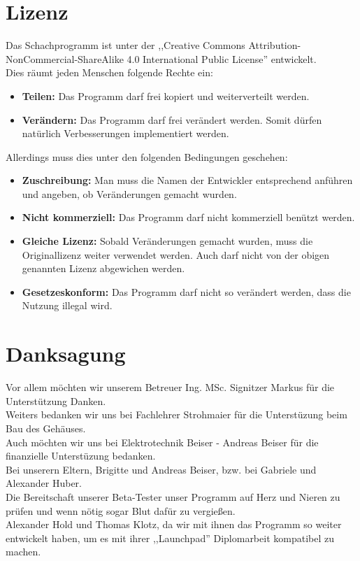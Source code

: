 \documentclass[12pt,a4paper]{article}
\begin{document}
{%
\clearpage\vfill\newpage{}

\section{Lizenz}
\label{SEC:licence}

Das Schachprogramm ist unter der ,,Creative Commons Attribution-NonCommercial-ShareAlike 4.0 International Public License'' entwickelt. \\
Dies räumt jeden Menschen folgende Rechte ein: 
\begin{itemize}
	\item{\textbf{Teilen:} Das Programm darf frei kopiert und weiterverteilt werden.}
	\item{\textbf{Verändern:} Das Programm darf frei verändert werden. Somit dürfen natürlich Verbesserungen implementiert werden.}
\end{itemize}

Allerdings muss dies unter den folgenden Bedingungen geschehen:
\begin{itemize}
	\item{\textbf{Zuschreibung:} Man muss die Namen der Entwickler entsprechend anführen und angeben, ob Veränderungen gemacht wurden.}
	\item{\textbf{Nicht kommerziell:} Das Programm darf nicht kommerziell benützt werden.}
	\item{\textbf{Gleiche Lizenz:} Sobald Veränderungen gemacht wurden, muss die Originallizenz weiter verwendet werden. Auch darf nicht von der obigen genannten Lizenz abgewichen werden.}
	\item{\textbf{Gesetzeskonform:} Das Programm darf nicht so verändert werden, dass die Nutzung illegal wird.}
\end{itemize}

\newpage
\section{Danksagung}
\label{SEC:THANKS}

Vor allem möchten wir unserem Betreuer Ing. MSc. Signitzer Markus für die Unterstützung Danken. \\
Weiters bedanken wir uns bei Fachlehrer Strohmaier für die Unterstüzung beim Bau des Gehäuses. \\[1ex]
Auch möchten wir uns bei Elektrotechnik Beiser - Andreas Beiser für die finanzielle Unterstüzung bedanken. \\[1ex]
Bei unserern Eltern, Brigitte und Andreas Beiser, bzw. bei Gabriele und Alexander Huber. \\
Die Bereitschaft unserer Beta-Tester unser Programm auf Herz und Nieren zu prüfen und wenn nötig sogar Blut dafür zu vergießen.\\
Alexander Hold und Thomas Klotz, da wir mit ihnen das Programm so weiter entwickelt haben, um es mit ihrer ,,Launchpad'' Diplomarbeit kompatibel zu machen. \\

}
\end{document}
